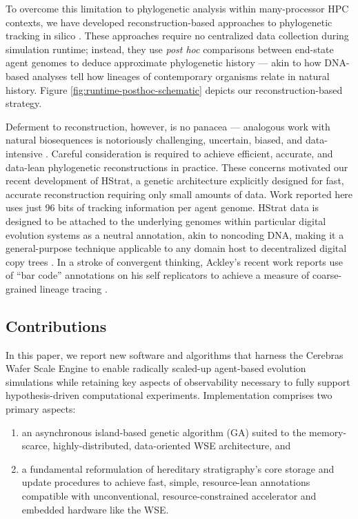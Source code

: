To overcome this limitation to phylogenetic analysis within many-processor HPC contexts, we have developed reconstruction-based approaches to phylogenetic tracking in silico \citep{moreno2022hereditary}.
These approaches require no centralized data collection during simulation runtime; instead, they use \textit{post hoc} comparisons between end-state agent genomes to deduce approximate phylogenetic history --- akin to how DNA-based analyses tell how lineages of contemporary organisms relate in natural history.
Figure \ref{fig:runtime-posthoc-schematic} depicts our reconstruction-based strategy.

Deferment to reconstruction, however, is no panacea --- analogous work with natural biosequences is notoriously challenging, uncertain, biased, and data-intensive \citep{TODOthatcitationfromabsractofpreprint}.
Careful consideration is required to achieve efficient, accurate, and data-lean phylogenetic reconstructions in practice.
These concerns motivated our recent development of HStrat, a genetic architecture explicitly designed for fast, accurate reconstruction requiring only small amounts of data.
Work reported here uses just 96 bits of tracking information per agent genome.
HStrat data is designed to be attached to the underlying genomes within particular digital evolution systems as a neutral annotation, akin to noncoding DNA, making it a general-purpose technique applicable to any domain host to decentralized digital copy trees \citep{FUNCITATIonsFRomPREPRINT}.
In a stroke of convergent thinking, Ackley's recent work reports use of ``bar code'' annotations on his self replicators to achieve a measure of coarse-grained lineage tracing \citep{ackley2023TODO}.

\subsection{Contributions}

In this paper, we report new software and algorithms that harness the Cerebras Wafer Scale Engine to enable radically scaled-up agent-based evolution simulations while retaining key aspects of observability necessary to fully support hypothesis-driven computational experiments.
Implementation comprises two primary aspects:
\begin{enumerate}
  \item an asynchronous island-based genetic algorithm (GA) suited to the memory-scarce, highly-distributed, data-oriented WSE architecture, and
  \item a fundamental reformulation of hereditary stratigraphy's core storage and update procedures to achieve fast, simple, resource-lean annotations compatible with unconventional, resource-constrained accelerator and embedded hardware like the WSE.
\end{enumerate}


